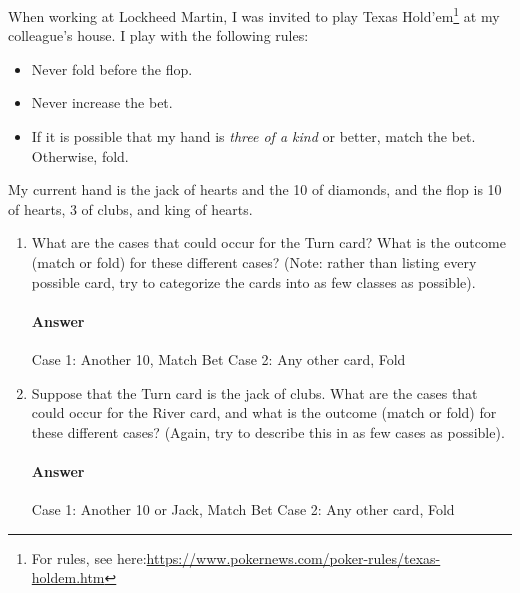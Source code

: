 \documentclass{article}
\begin{document}

When working at Lockheed Martin, I was invited to play Texas
Hold'em\footnote{For rules, see
here:\url{https://www.pokernews.com/poker-rules/texas-holdem.htm}} at my
colleague's house.  I play with the following rules:
\begin{itemize}
    \item Never fold before the flop.
    \item Never increase the bet.
    \item If it is possible that my hand is \emph{three of a kind} or better,
        match the bet.  Otherwise, fold.
\end{itemize}
My current hand is the jack of hearts and the 10 of diamonds, and the flop is 10
of hearts, 3 of clubs, and king of hearts.

\begin{enumerate}

    \item What are the cases that could occur for the Turn card?  What is the
        outcome (match or fold) for these different cases? (Note: rather than
        listing every possible card, try to categorize the cards into as few
        classes as possible).

    \paragraph{Answer}
    Case 1: Another 10, Match Bet
	Case 2: Any other card, Fold

    \item Suppose that the Turn card is the jack of clubs.
        What are the cases that could occur for the River card, and what is the
        outcome (match or fold) for these different cases?  (Again, try to
        describe this in as few cases as possible).

    \paragraph{Answer}
    Case 1: Another 10 or Jack, Match Bet
	Case 2: Any other card, Fold

\end{enumerate}


\end{document}
